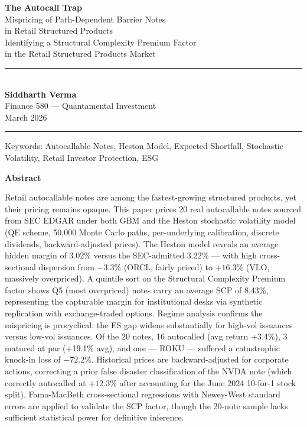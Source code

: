 \documentclass[10pt,a4paper]{article}
\begin{document}
\begin{titlepage}\centering\vspace*{1.5cm}
{\Huge\bfseries The Autocall Trap}\\[0.5cm]
{\LARGE Mispricing of Path-Dependent Barrier Notes\\in Retail Structured Products}\\[1.2cm]
{\large Identifying a Structural Complexity Premium Factor\\in the Retail Structured Products Market}\\[2cm]
\rule{0.6\textwidth}{0.4pt}\\[0.8cm]
{\Large\bfseries Siddharth Verma}\\[0.4cm]
{\large Finance 580 --- Quantamental Investment}\\[0.3cm]
{\large March 2026}\\[1cm]
\rule{0.6\textwidth}{0.4pt}\vfill
{\small Keywords: Autocallable Notes, Heston Model, Expected Shortfall, Stochastic Volatility, Retail Investor Protection, ESG}
\end{titlepage}

\newpage\begin{center}{\Large\bfseries Abstract}\end{center}\vspace{0.3cm}
\noindent Retail autocallable notes are among the fastest-growing structured products, yet their pricing remains opaque. This paper prices 20 real autocallable notes sourced from SEC EDGAR under both GBM and the Heston stochastic volatility model (QE scheme, 50,000 Monte Carlo paths, per-underlying calibration, discrete dividends, backward-adjusted prices). The Heston model reveals an average hidden margin of 3.02\% versus the SEC-admitted 3.22\% --- with high cross-sectional dispersion from $-3.3\%$ (ORCL, fairly priced) to $+16.3\%$ (VLO, massively overpriced). A quintile sort on the Structural Complexity Premium factor shows Q5 (most overpriced) notes carry an average SCP of 8.43\%, representing the capturable margin for institutional desks via synthetic replication with exchange-traded options. Regime analysis confirms the mispricing is procyclical: the ES gap widens substantially for high-vol issuances versus low-vol issuances. Of the 20 notes, 16 autocalled (avg return +3.4\%), 3 matured at par (+19.1\% avg), and one --- ROKU --- suffered a catastrophic knock-in loss of $-72.2\%$. Historical prices are backward-adjusted for corporate actions, correcting a prior false disaster classification of the NVDA note (which correctly autocalled at $+12.3\%$ after accounting for the June 2024 10-for-1 stock split). Fama-MacBeth cross-sectional regressions with Newey-West standard errors are applied to validate the SCP factor, though the 20-note sample lacks sufficient statistical power for definitive inference.
\end{document}
